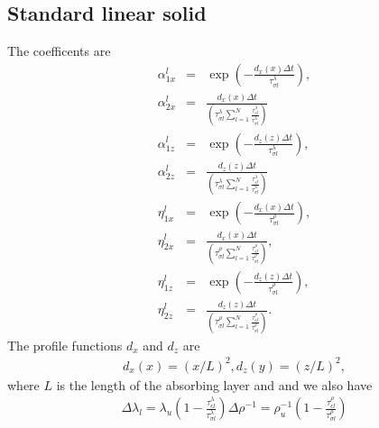 \documentclass[11pt]{article}
\begin{document}
{\subsection*{Standard linear solid}
The coefficents are
\begin{eqnarray*}
\alpha^l_{1x}  & = & \exp\left(-\frac{d_x(x)\Delta t}
                          {\tau^{\lambda}_{\sigma l}}\right),        \\
\alpha^l_{2x}  & = & \frac{d_x(x)\Delta t}
                  {(\tau^{\lambda}_{\sigma l}
                   \sum_{l=1}^N \frac{\tau^{\lambda}_{\epsilon l}}
                                     {\tau^{\lambda}_{\sigma l}  })
                  }                                                  \\
\alpha^l_{1z}  & = & \exp\left(-\frac{d_z(z)\Delta t}
                          {\tau^{\lambda}_{\sigma l}}\right),        \\
\alpha^l_{2z}  & = & \frac{d_z(z)\Delta t}
                  {(\tau^{\lambda}_{\sigma l}
                   \sum_{l=1}^N \frac{\tau^{\lambda}_{\epsilon l}}
                                     {\tau^{\lambda}_{\sigma l}  })
                  }                                                  \\
\eta^l_{1x}  & = & \exp\left(-\frac{d_x(x)\Delta t}
                          {\tau^{\rho}_{\sigma l}}\right),           \\
\eta^l_{2x}  & = & \frac{d_x(x)\Delta t}
                  {(\tau^{\rho}_{\sigma l}
                   \sum_{l=1}^N \frac{\tau^{\rho}_{\epsilon l}}
                                     {\tau^{\rho}_{\sigma l}  })
                  },                                                 \\
\eta^l_{1z}  & = & \exp\left(-\frac{d_z(z)\Delta t}
                          {\tau^{\rho}_{\sigma l}}\right),           \\
\eta^l_{2z}  & = & \frac{d_z(z)\Delta t}
                  {(\tau^{\rho}_{\sigma l}
                   \sum_{l=1}^N \frac{\tau^{\rho}_{\epsilon l}}
                                     {\tau^{\rho}_{\sigma l}  })
                  }.
\end{eqnarray*}
The profile functions $d_x$ and $d_z$ are
\begin{eqnarray*}
  d_x(x) = (x/L)^2,
  d_z(y) = (z/L)^2,
\end{eqnarray*}
where $L$ is the length of the absorbing layer and 
and we also have
\begin{eqnarray}
\Delta \lambda_l = \lambda_u\left(1-\frac{\tau^{\lambda}_{\epsilon l}}{\tau^{\lambda}_{\sigma l}}\right)
\Delta \rho^{-1} = \rho^{-1}_u\left(1-\frac{\tau^{\rho}_{\epsilon l}}{\tau^{\rho}_{\sigma l}}\right)
\end{eqnarray}
}
\end{document}
